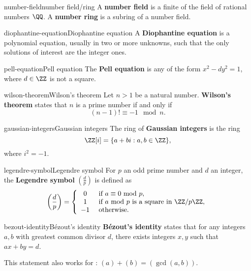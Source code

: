 \begin{topic}{number-field}{number field/ring}
    A \textbf{number field} is a finite  of the field of rational numbers $\QQ$. A \textbf{number ring} is a subring of a number field.
\end{topic}

\begin{topic}{diophantine-equation}{Diophantine equation}
    A \textbf{Diophantine equation} is a polynomial equation, usually in two or more unknowns, such that the only solutions of interest are the integer ones.
\end{topic}

\begin{topic}{pell-equation}{Pell equation}
    The \textbf{Pell equation} is any  of the form $x^2 - dy^2 = 1$, where $d \in \ZZ$ is not a square.
\end{topic}

\begin{topic}{wilson-theorem}{Wilson's theorem}
    Let $n > 1$ be a natural number. \textbf{Wilson's theorem} states that $n$ is a prime number if and only if
    \[ (n - 1) ! \equiv -1 \mod n . \]
\end{topic}

\begin{topic}{gaussian-integers}{Gaussian integers}
    The ring of \textbf{Gaussian integers} is the ring
    \[ \ZZ[i] = \{ a + bi : a, b \in \ZZ \}, \]
    where $i^2 = -1$.
\end{topic}

\begin{topic}{legendre-symbol}{Legendre symbol}
    For $p$ an odd prime number and $d$ an integer, the \textbf{Legendre symbol} $\left(\tfrac{d}{p}\right)$ is defined as
    \[ \left(\frac{d}{p}\right) = \left\{ \begin{array}{cl}
        0 & \text{ if $a \equiv 0 \text{ mod } p$} , \\
        1 & \text{ if $a \text{ mod } p$ is a square in $\ZZ/p\ZZ$} ,  \\
        -1 & \text{ otherwise} .
    \end{array} \right. \]
\end{topic}

\begin{topic}{bezout-identity}{Bézout's identity}
    \textbf{Bézout's identity} states that for any integers $a, b$ with greatest common divisor $d$, there exists integers $x, y$ such that $ax + by = d$.
    
    This statement also works for : $(a) + (b) = (\gcd(a, b))$.
\end{topic}

